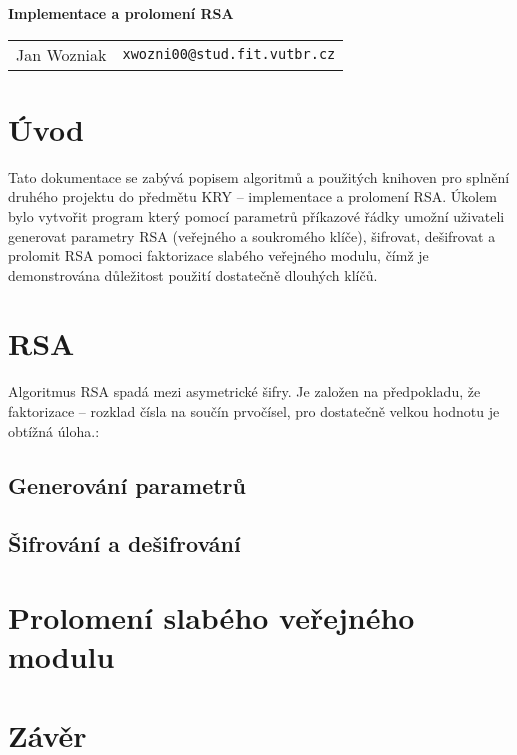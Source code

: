 \documentclass[a4paper,11pt]{article}
\begin{document}
\begin{center}{\LARGE\textbf{Implementace a prolomení RSA}}\\[0.2cm]
\newcommand{\autor}[2]{#1&\texttt{#2@stud.fit.vutbr.cz}\tabularnewline}
\begin{tabular}{ll}
    \autor{Jan Wozniak}{xwozni00}
\end{tabular}
\end{center}


\section{Úvod}
Tato dokumentace se zabývá popisem algoritmů a použitých knihoven pro splnění druhého projektu
do předmětu KRY -- implementace a prolomení RSA. Úkolem bylo vytvořit program který pomocí
parametrů příkazové řádky umožní uživateli generovat parametry RSA (veřejného a soukromého
klíče), šifrovat, dešifrovat a prolomit RSA pomoci faktorizace slabého veřejného modulu, čímž
je demonstrována důležitost použití dostatečně dlouhých klíčů.

\section{RSA}
Algoritmus RSA spadá mezi asymetrické šifry. Je založen na předpokladu, že faktorizace --
rozklad čísla na součín prvočísel, pro dostatečně velkou hodnotu je obtížná úloha.:
\subsection*{Generování parametrů}
\subsection*{Šifrování a dešifrování}

\section{Prolomení slabého veřejného modulu}

\section{Závěr}
\end{document}
